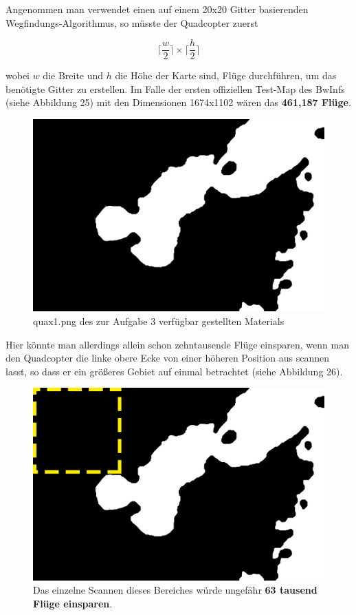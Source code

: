 \documentclass[a4paper,12pt]{article}
\begin{document}
Angenommen man verwendet einen auf einem 20x20 Gitter basierenden Wegfindungs-Algorithmus, so müsste der Quadcopter zuerst
\begin{center}
\begin{Large}
\[\lceil \frac{w}{2}\rceil \times \lceil \frac{h}{2}\rceil\]
\end{Large}
\end{center}
wobei $w$ die Breite und $h$ die Höhe der Karte sind, Flüge durchführen, um das benötigte Gitter zu erstellen.
Im Falle der ersten offiziellen Test-Map des BwInfs (siehe Abbildung 25) mit den Dimensionen 1674x1102 wären das \textbf{461,187 Flüge}.
\begin{figure}[H]
\centering
    \includegraphics[width=0.8\linewidth]{Bilder/Aufgabe3/Maps/quax1.png}
    \caption{quax1.png des zur Aufgabe 3 verfügbar gestellten Materials}
\end{figure}
Hier könnte man allerdings allein schon zehntausende Flüge einsparen, wenn man den Quadcopter die linke obere Ecke von einer höheren Position aus scannen lasst, so dass er ein größeres Gebiet auf einmal betrachtet (siehe Abbildung 26).
\begin{figure}[H]
\centering
    \includegraphics[width=0.8\linewidth]{Bilder/Aufgabe3/Einsparung_Fluege.png}
    \caption{Das einzelne Scannen dieses Bereiches würde ungefähr \textbf{63 tausend Flüge einsparen}.}
\end{figure}
\end{document}
